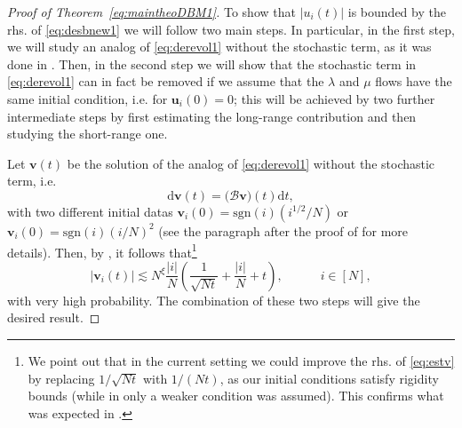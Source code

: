 \documentclass[10pt]{amsart}
\numberwithin{equation}{section}
\newcommand{\dif}{\mathrm{d}}
\begin{document}
\begin{proof}[Proof of Theorem~\ref{eq:maintheoDBM1}]
To show that $|u_i(t)|$ is bounded by the rhs. of \eqref{eq:desbnew1} we will follow two main steps. In particular, in the first step, we will study an analog of \eqref{eq:derevol1} without the stochastic term, as it was done in \cite[Proposition~4.6]{bourgade2024fluctuations}. Then, in the second step we will show that the stochastic term in \eqref{eq:derevol1} can in fact be removed if we assume that the $\lambda$ and $\mu$ flows have the same initial condition, i.e. for ${\bm u}_i(0)=0$; this will be achieved by two further intermediate steps by first estimating the long-range contribution and then studying the short-range one.


Let ${\bm v}(t)$ be the solution of the analog of \eqref{eq:derevol1} without the stochastic term, i.e.
\begin{equation}
\dif {\bm v}(t)=\big(\mathcal{B}{\bm v}\big)(t)\dif t,
\end{equation}
with two different initial datas ${\bm v}_i(0)=\mathrm{sgn}(i)(i^{1/2}/N)$ or ${\bm v}_i(0)=\mathrm{sgn}(i)(i/N)^2$ (see the paragraph after the proof of \cite[Lemma 4.21]{bourgade2024fluctuations} for more details). Then, by \cite[Proposition~4.6]{bourgade2024fluctuations}, it follows that\footnote{\label{ftn:DBM} We point out that in the current setting we could improve the rhs. of \eqref{eq:estv} by replacing $1/\sqrt{Nt}$ with $1/(Nt)$, as our initial conditions satisfy rigidity bounds (while in \cite{bourgade2024fluctuations} only a weaker condition was assumed). This confirms what was expected in \cite[Remark 4.19]{bourgade2024fluctuations}.}
\begin{equation}
\label{eq:estv}
\big|{\bm v}_i(t)\big|\lesssim N^\xi\frac{|i|}{N}\left(\frac{1}{\sqrt{Nt}}+\frac{|i|}{N}+t\right), \qquad\quad i\in [N],
\end{equation}
with very high probability. The combination of these two steps will give the desired result.


\end{proof}
\end{document}
